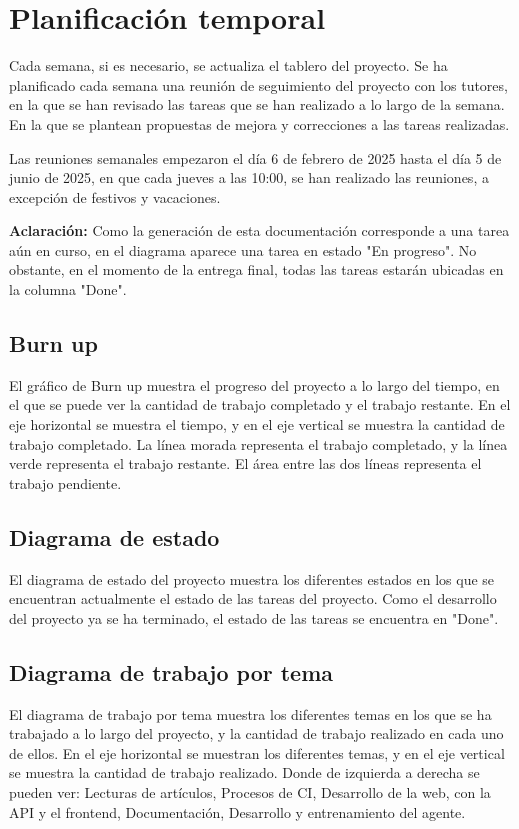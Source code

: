 \section{Planificación temporal}
Cada semana, si es necesario, se actualiza el tablero del proyecto.
Se ha planificado cada semana una reunión de seguimiento del proyecto con los tutores, en la que se han revisado las tareas que se han realizado a lo largo de la semana. En la que se plantean propuestas de mejora y correcciones a las tareas realizadas.

Las reuniones semanales empezaron el día 6 de febrero de 2025 hasta el día 5 de junio de 2025, en que cada jueves a las 10:00, se han realizado las reuniones, a excepción de festivos y vacaciones.

\textbf{Aclaración:} Como la generación de esta documentación corresponde a una tarea aún en curso, en el diagrama aparece una tarea en estado "En progreso". No obstante, en el momento de la entrega final, todas las tareas estarán ubicadas en la columna "Done".

\subsection{Burn up}
El gráfico de Burn up muestra el progreso del proyecto a lo largo del tiempo, en el que se puede ver la cantidad de trabajo completado y el trabajo restante. En el eje horizontal se muestra el tiempo, y en el eje vertical se muestra la cantidad de trabajo completado. La línea morada representa el trabajo completado, y la línea verde representa el trabajo restante. El área entre las dos líneas representa el trabajo pendiente.


\subsection{Diagrama de estado}
El diagrama de estado del proyecto muestra los diferentes estados en los que se encuentran actualmente el estado de las tareas del proyecto. Como el desarrollo del proyecto ya se ha terminado, el estado de las tareas se encuentra en "Done". 



\subsection{Diagrama de trabajo por tema}
El diagrama de trabajo por tema muestra los diferentes temas en los que se ha trabajado a lo largo del proyecto, y la cantidad de trabajo realizado en cada uno de ellos. En el eje horizontal se muestran los diferentes temas, y en el eje vertical se muestra la cantidad de trabajo realizado.
Donde de izquierda a derecha se pueden ver: Lecturas de artículos,  Procesos de CI, Desarrollo de la web, con la API y el frontend, Documentación, Desarrollo y entrenamiento del agente.

